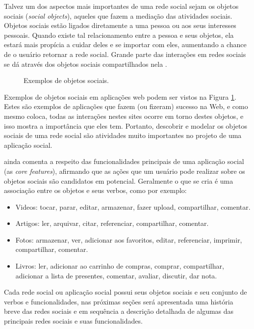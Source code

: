\documentclass[diss]{template/setrem}
\begin{document}
Talvez um dos aspectos mais importantes de uma rede social sejam os objetos sociais (\emph{social objects}), aqueles que fazem a mediação das atividades sociais. Objetos sociais estão ligados diretamente a uma pessoa ou aos seus interesses pessoais. Quando existe tal relacionamento entre a pessoa e seus objetos, ela estará mais propícia a cuidar deles e se importar com eles, aumentando a chance de o usuário retornar a rede social. Grande parte das interações em redes sociais se dá através dos objetos sociais compartilhados nela \citep{Bell2009, Porter2008}.

\begin{figure}
    \caption{Exemplos de objetos sociais.}
    \label{fig:social-objects}
\end{figure}

Exemplos de objetos sociais em aplicações web podem ser vistos na Figura \ref{fig:social-objects}. Estes são exemplos de aplicações que fazem (ou fizeram) sucesso na Web, e como \citet{Porter2008} mesmo coloca, todas as interações nestes sites ocorre em torno destes objetos, e isso mostra a importância que eles tem. Portanto, descobrir e modelar os objetos sociais de uma rede social são atividades muito importantes no projeto de uma aplicação social.

\citet{Porter2008} ainda comenta a respeito das funcionalidades principais de uma aplicação social (as \emph{core features}), afirmando que as ações que um usuário pode realizar sobre os objetos sociais são candidatos em potencial. Geralmente o que se cria é uma associação entre os objetos e seus verbos, como por exemplo:

\begin{itemize}
	\item Videos: tocar, parar, editar, armazenar, fazer upload, compartilhar, comentar.
	\item Artigos: ler, arquivar, citar, referenciar, compartilhar, comentar.
	\item Fotos: armazenar, ver, adicionar aos favoritos, editar, referenciar, imprimir, compartilhar, comentar.
	\item Livros: ler, adicionar ao carrinho de compras, comprar, compartilhar, adicionar a lista de presentes, comentar, avaliar, discutir,  dar nota.
\end{itemize}

Cada rede social ou aplicação social possui seus objetos sociais e seu conjunto de verbos e funcionalidades, nas próximas seções será apresentada uma história breve das redes sociais e em sequência a descrição detalhada de algumas das principais redes sociais e suas funcionalidades.
\end{document}
